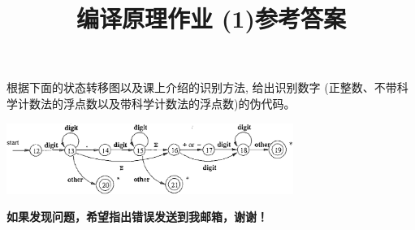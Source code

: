 \documentclass[a4paper]{ctexart}
\title{编译原理作业 (1)参考答案}
\begin{document}
\maketitle

\begin{problem}[手写词法分析器]
    根据下面的状态转移图以及课上介绍的识别方法, 给出识别数字
    (正整数、不带科学计数法的浮点数以及带科学计数法的浮点数)的伪代码。

    {\centering\includegraphics[width=0.70\textwidth]{figs/number} }
\end{problem}
\begin{solution}
  \bfseries{如果发现问题，希望指出错误发送到我邮箱，谢谢！}
  \begin{breakablealgorithm}


\end{breakablealgorithm}
\end{solution}
\end{document}
